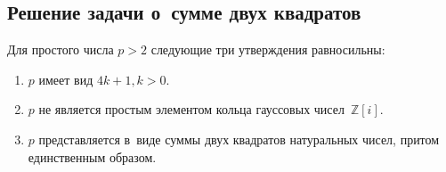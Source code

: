 \documentclass{article}
\begin{document}
\subsection{Решение задачи о~сумме двух квадратов}

\begin{claim}
  Для простого числа $p > 2$ следующие три утверждения равносильны:
  \begin{enumerate}[label=(\arabic*)]
    \item $p$ имеет вид $4k + 1, k > 0$.
    \item $p$ не является простым элементом кольца гауссовых
      чисел~$\mathbb{Z}[i]$.
    \item $p$ представляется в~виде суммы двух квадратов натуральных чисел,
      притом единственным образом.
  \end{enumerate}
\end{claim}
\end{document}
